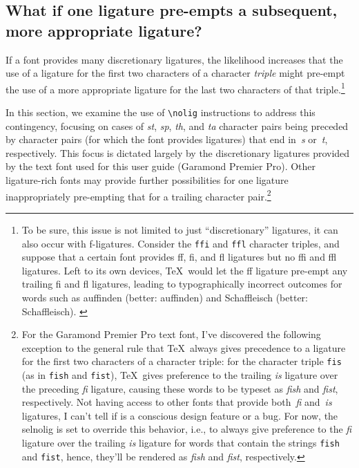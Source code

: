 \documentclass[12pt]{article}
\newcommand{\pkg}[1]{\textsf{#1}}
\newcommand{\opt}[1]{\texttt{#1}}
\newcommand{\cmmd}[1]{\texttt{\textbackslash #1}}
\begin{document}
\subsection{What if one ligature pre-empts a subsequent, more appropriate ligature?} \label{sec:preempt}

If a font provides many discretionary ligatures, the likelihood increases that the use of a ligature for the first two characters of a character \emph{triple} might pre-empt the use of a more appropriate ligature for the last two characters of that triple.\footnote{To be sure, this issue is not limited to just \enquote{discretionary} ligatures, it can also occur with f-ligatures. Consider the \opt{ffi} and \opt{ffl} character triples, and suppose that a certain font provides ff, fi, and fl ligatures but no ffi and ffl ligatures. Left to its own devices, \TeX\ would let the ff ligature pre-empt any trailing fi and fl ligatures, leading to typographically incorrect outcomes for words such as au\mbox{ff}inden (better: auffinden) and Scha\mbox{ff}leisch (better: Schaffleisch). \label{fn:triple}} 

In this section, we examine the use of \cmmd{nolig} instructions to address this contingency, focusing on cases of \emph{st}, \emph{sp}, \emph{th}, and \emph{ta} character pairs being preceded by character pairs (for which the font provides ligatures) that end in~\emph{s} or~\emph{t}, respectively. This focus is dictated largely by the discretionary ligatures provided by the text font used for this user guide (Garamond Premier Pro). Other ligature-rich fonts may provide further possibilities for one ligature inappropriately pre-empting that for a trailing character pair.\footnote{For the Garamond Premier Pro text font, I've discovered the following exception to the general rule that \TeX\ always gives precedence to a ligature for the first two characters of a character triple: for the character triple \opt{fis} (as in \opt{fish} and \opt{fist}), \TeX\ gives preference to the trailing \emph{is} ligature over the preceding \emph{fi} ligature, causing these words to be typeset as \emph{f\mbox{is}h} and \emph{f\mbox{is}t}, respectively. Not having access to other fonts that provide both~\emph{fi} and~\emph{is} ligatures, I can't tell if is a conscious design feature or a bug. For now, the \pkg{selnolig} is set to override this behavior, i.e., to always give preference to the \emph{fi} ligature over the trailing \emph{is} ligature for words that contain the strings \opt{fish} and \opt{fist}, hence, they'll be rendered as \emph{fish} and \emph{fist}, respectively.}
\end{document}
